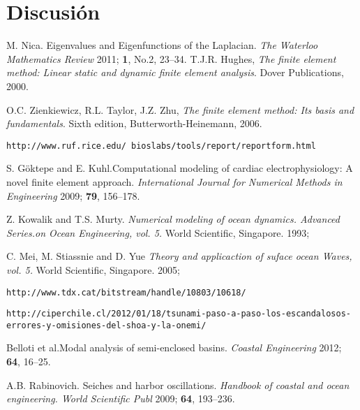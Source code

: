 \documentclass[12pt, letterpaper]{article}
\begin{document}
\section{Discusi\'on}
  


\begin{thebibliography}{10}

  M. Nica. Eigenvalues and Eigenfunctions of the Laplacian. \emph{The Waterloo Mathematics Review} 2011; {\bf 1}, No.2, 23--34.
  T.J.R. Hughes, \emph{The finite element method: Linear static and dynamic finite element analysis}. Dover Publications, 2000.
  
  O.C. Zienkiewicz, R.L. Taylor, J.Z. Zhu, \emph{The finite element method: Its basis and fundamentals}. Sixth edition, Butterworth-Heinemann, 2006.  

 {\tt http://www.ruf.rice.edu/~bioslabs/tools/report/reportform.html }

	S. G\"{o}ktepe and E. Kuhl.Computational modeling of cardiac electrophysiology: A novel finite element approach. \emph{International Journal for Numerical Methods in Engineering} 2009; {\bf 79}, 156--178.
	
	Z. Kowalik and T.S. Murty. \emph{Numerical modeling of ocean dynamics. Advanced Series.on Ocean Engineering, vol. 5. }World Scientific, Singapore. 1993; 
	
	C. Mei, M. Stiassnie and D. Yue \emph{Theory and applicaction of suface ocean Waves, vol. 5. }World Scientific, Singapore. 2005; 

 {\tt http://www.tdx.cat/bitstream/handle/10803/10618/}

 {\tt http://ciperchile.cl/2012/01/18/tsunami-paso-a-paso-los-escandalosos-errores-y-omisiones-del-shoa-y-la-onemi/
}

	Belloti et al.Modal analysis of semi-enclosed basins. \emph{Coastal Engineering} 2012; {\bf 64}, 16--25.

	A.B. Rabinovich. Seiches and harbor oscillations. \emph{Handbook of coastal and ocean engineering. World Scientific Publ} 2009; {\bf 64}, 193--236.



\end{thebibliography}
\end{document}
